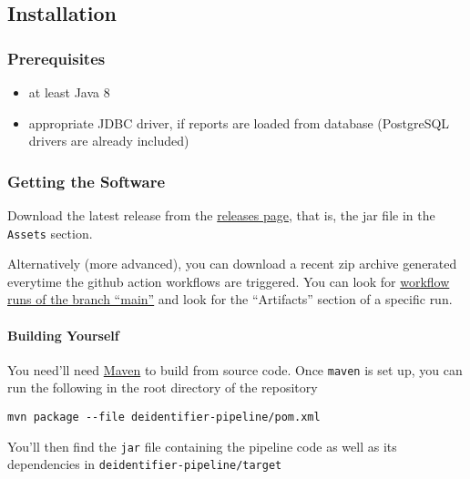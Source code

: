\subsection{Installation}\label{installation}

\subsubsection{Prerequisites}\label{prerequisites}

\begin{itemize}
\tightlist
\item
  at least Java 8
\item
  appropriate JDBC driver, if reports are loaded from database
  (PostgreSQL drivers are already included)
\end{itemize}

\subsubsection{Getting the Software}\label{getting-the-software}

Download the latest release from the
\href{https://github.com/ratschlab/medical-reports-deidentification/releases}{releases
page}, that is, the jar file in the \texttt{Assets} section.

Alternatively (more advanced), you can download a recent zip archive
generated everytime the github action workflows are triggered. You can
look for
\href{https://github.com/ratschlab/medical-reports-deidentification/actions}{workflow
runs of the branch ``main''} and look for the ``Artifacts'' section of a
specific run.

\paragraph{Building Yourself}\label{building-yourself}

You need'll need \href{https://maven.apache.org/install.html}{Maven} to
build from source code. Once \texttt{maven} is set up, you can run the
following in the root directory of the repository

\begin{verbatim}
mvn package --file deidentifier-pipeline/pom.xml
\end{verbatim}

You'll then find the \texttt{jar} file containing the pipeline code as
well as its dependencies in \texttt{deidentifier-pipeline/target}

